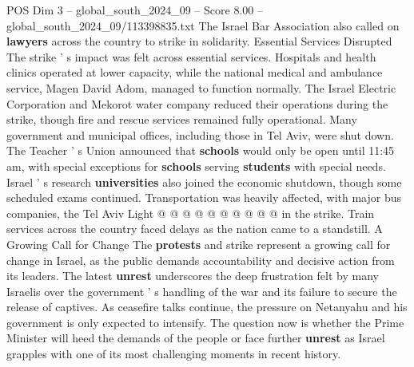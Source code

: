 \begin{textsample}{POS Dim 3 – global\_south\_2024\_09 – Score 8.00 – global\_south\_2024\_09/113398835.txt}
The Israel Bar Association also called on \textbf{lawyers} across the country to strike in solidarity.
Essential Services Disrupted The strike ' s impact was felt across essential services.
Hospitals and health clinics operated at lower capacity, while the national medical and ambulance service, Magen David Adom, managed to function normally.
The Israel Electric Corporation and Mekorot water company reduced their operations during the strike, though fire and rescue services remained fully operational.
Many government and municipal offices, including those in Tel Aviv, were shut down.
The Teacher ' s Union announced that \textbf{schools} would only be open until 11:45 am, with special exceptions for \textbf{schools} serving \textbf{students} with special needs.
Israel ' s research \textbf{universities} also joined the economic shutdown, though some scheduled exams continued.
Transportation was heavily affected, with major bus companies, the Tel Aviv Light @ @ @ @ @ @ @ @ @ @ in the strike.
Train services across the country faced delays as the nation came to a standstill.
A Growing Call for Change The \textbf{protests} and strike represent a growing call for change in Israel, as the public demands accountability and decisive action from its leaders.
The latest \textbf{unrest} underscores the deep frustration felt by many Israelis over the government ' s handling of the war and its failure to secure the release of captives.
As ceasefire talks continue, the pressure on Netanyahu and his government is only expected to intensify.
The question now is whether the Prime Minister will heed the demands of the people or face further \textbf{unrest} as Israel grapples with one of its most challenging moments in recent history.

\end{textsample}
